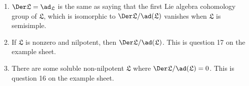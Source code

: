 \begin{enumerate}
	\item $\Der \mathfrak{L} = \ad_{\mathfrak{L}}$ is the same as saying that
		the first Lie algebra cohomology group of $\mathfrak{L}$, which is
		isomorphic to $\Der \mathfrak{L}/\ad(\mathfrak{L})$ vanishes when
		$\mathfrak{L}$ is semisimple.
	\item If $\mathfrak{L}$ is nonzero and nilpotent, then
		$\Der \mathfrak{L}/\ad(\mathfrak{L})$. This is question 17 on the
		example sheet.
	\item There are some soluble non-nilpotent $\mathfrak{L}$ where
		$\Der \mathfrak{L}/\ad(\mathfrak{L}) = 0$. This is question 16 on the
		example sheet.
\end{enumerate}
